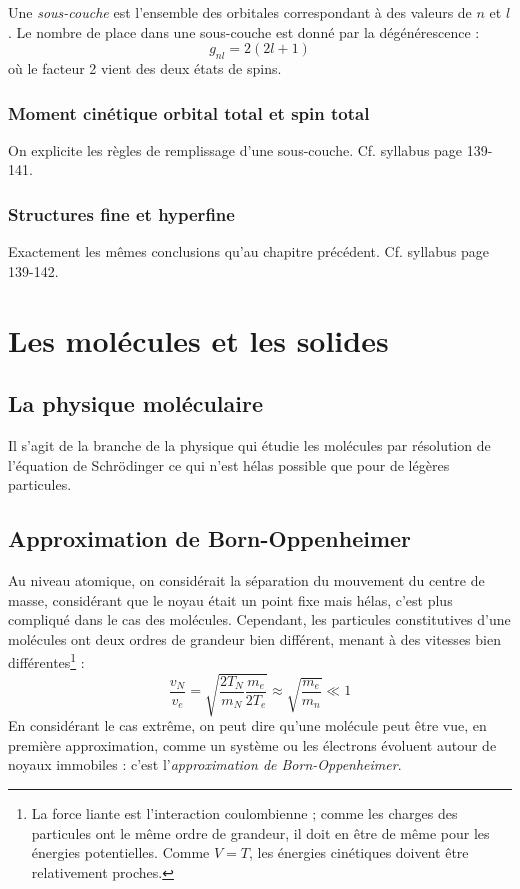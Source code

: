 \documentclass	[11pt, a4paper, openany]{book}
\begin{document}
	Une \textit{sous-couche} est l'ensemble des orbitales correspondant à des valeurs de 
	$n$ et $l$. Le nombre de place dans une sous-couche est donné par la dégénérescence :
	\begin{equation}
	g_{nl} = 2(2l+1)
	\end{equation}
	où le facteur 2 vient des deux états de spins.
	
	\subsection{Moment cinétique orbital total et spin total}
	On explicite les règles de remplissage d'une sous-couche. Cf. syllabus page 139-141.
	
	\subsection{Structures fine et hyperfine}
	Exactement les mêmes conclusions qu'au chapitre précédent. Cf. syllabus page 139-142.
	
	
	
	
	
	
	
	
	
\chapter{Les molécules et les solides}

\section{La physique moléculaire}
Il s'agit de la branche de la physique qui étudie les molécules par résolution de l'équation 
de Schrödinger ce qui n'est hélas possible que pour de légères particules.

\section{Approximation de Born-Oppenheimer}
Au niveau atomique, on considérait la séparation du mouvement du centre de masse, considérant
que le noyau était un point fixe mais hélas, c'est plus compliqué dans le cas des molécules. 
Cependant, les particules constitutives d'une molécules ont deux ordres de grandeur bien 
différent, menant à des vitesses bien différentes\footnote{La force liante est l'interaction
coulombienne ; comme les charges des particules ont le même ordre de grandeur, il doit en 
être de même pour les énergies potentielles. Comme $V = T$, les énergies cinétiques doivent 
être relativement proches.} :
\begin{equation}
\frac{v_N}{v_e} = \sqrt{\frac{2T_N}{m_N}\frac{m_e}{2T_e}} \approx \sqrt{\frac{m_e}{m_n}} \ll 1
\end{equation}
En considérant le cas extrême, on peut dire qu'une molécule peut être vue, en première 
approximation, comme un système ou les électrons évoluent autour de noyaux immobiles : c'est 
l'\textit{approximation de Born-Oppenheimer}.
\end{document}
